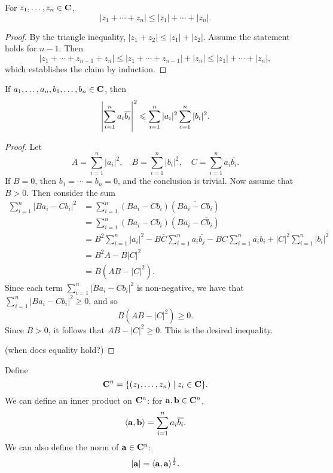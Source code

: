 \begin{corollary}
For $z_1,\dots,z_n\in\mathbf C$,
\[|z_1+\cdots+z_n|\le|z_1|+\cdots+|z_n|.\]
\end{corollary}

\begin{proof}
By the triangle inequality, $|z_1+z_2|\le|z_1|+|z_2|$. Assume the statement holds for $n-1$. Then
\[|z_1+\cdots+z_{n-1}+z_n|\le|z_1+\cdots+z_{n-1}|+|z_n|\le|z_1|+\cdots+|z_n|,\]
which establishes the claim by induction.
\end{proof}

\begin{theorem}
If $a_1,\dots,a_n,b_1,\dots,b_n\in\mathbf C$, then
\begin{equation}
\left|\sum_{i=1}^{n}a_i\overline{b_i}\right|^2\leqslant\sum_{i=1}^{n}|a_i|^2\sum_{i=1}^{n}|b_i|^2.
\end{equation}
\end{theorem}

\begin{proof}
Let
\[A=\sum_{i=1}^{n}|a_i|^2,\quad B=\sum_{i=1}^{n}|b_i|^2,\quad C=\sum_{i=1}^{n}a_i\overline{b_i}.\]
If $B=0$, then $b_1=\cdots=b_n=0$, and the conclusion is trivial. Now assume that $B>0$. Then consider the sum
\begin{align*}
\sum_{i=1}^{n}|Ba_i-Cb_i|^2
&=\sum_{i=1}^{n}(Ba_i-Cb_i)(\overline{Ba_i-Cb_i})\\
&=\sum_{i=1}^{n}(Ba_i-Cb_i)(B\overline{a_i}-\overline{Cb_i})\\
&=B^2\sum_{i=1}^{n}|a_i|^2-B\overline{C}\sum_{i=1}^{n}a_i\overline{b_j}-BC\sum_{i=1}^{n}\overline{a_i}b_i+|C|^2\sum_{i=1}^{n}|b_i|^2\\
&=B^2A-B|C|^2\\
&=B(AB-|C|^2).
\end{align*}
Since each term $\displaystyle\sum_{i=1}^{n}|Ba_i-Cb_i|^2$ is non-negative, we have that $\displaystyle\sum_{i=1}^{n}|Ba_i-Cb_i|^2\ge0$, and so
\[B(AB-|C|^2)\ge0.\]
Since $B>0$, it follows that $AB-|C|^2\ge0$. This is the desired inequality.

(when does equality hold?)
\end{proof}

\begin{mdframed}
Define
\[\mathbf C^n=\{(z_1,\dots,z_n)\mid z_i\in\mathbf C\}.\]
We can define an inner product on $\mathbf C^n$: for $\vb{a},\vb{b}\in\mathbf C^n$,
\[\langle\vb{a},\vb{b}\rangle=\sum_{i=1}^{n}a_i\overline{b_i}.\]
We can also define the norm of $\vb{a}\in\mathbf C^n$:
\[|\vb{a}|=\langle\vb{a},\vb{a}\rangle^\frac{1}{2}.\]
\end{mdframed}
\pagebreak

